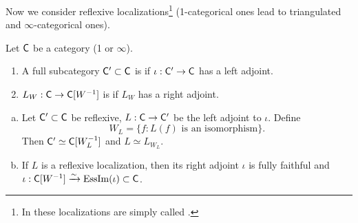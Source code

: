 Now we consider reflexive localizations\footnote{In \cite{htt} these localizations are
simply called .}
(1-categorical ones lead to triangulated and
$\infty$-categorical ones).
\begin{definition}
Let $\mathsf{C}$ be a category (1 or $\infty$).
\begin{enumerate}[1)]
\item A full subcategory $\mathsf{C}'\subset \mathsf{C}$ is  if $\iota:\C'\to \C$ has a
left adjoint.
\item $L_W:\C\to \C[W^{-1}]$ is  if $L_W$ has a right adjoint.
\end{enumerate}
\end{definition}

\begin{lemma} \leavevmode
\begin{enumerate}[a)]
\item Let $\mathsf{C}'\subset \mathsf{C}$ be reflexive, $L:\C\to \C'$ be the left adjoint to $\iota$. Define
\[
W_L=\{f:L(f)\text{ is an isomorphism}\}.
\]
Then $\mathsf{C}'\simeq \mathsf{C}[W_L^{-1}]$ and $L\simeq L_{W_L}$.
\item If $L$ is a reflexive localization, then its right adjoint $\iota$ is fully
faithful and $\iota:\mathsf{C}[W^{-1}] \xrightarrow{\sim} \operatorname{EssIm}(\iota)\subset \mathsf{C}$.
\end{enumerate}
\end{lemma}

